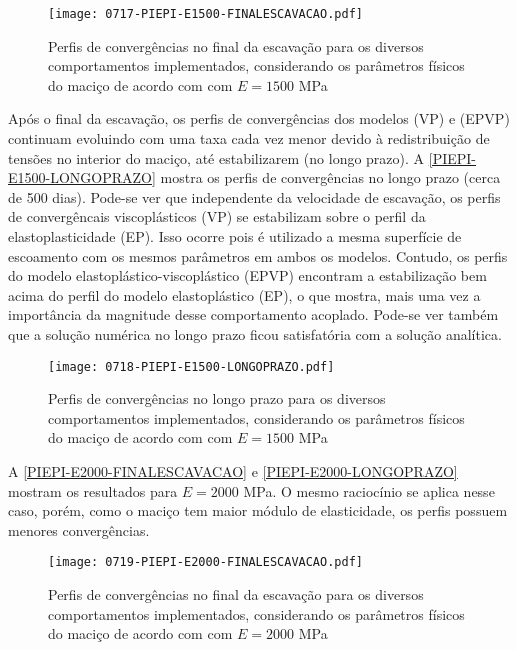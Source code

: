 \begin{figure}[H]
	\begin{center}
		\texttt{[image: 0717-PIEPI-E1500-FINALESCAVACAO.pdf]}
	\end{center}
	\caption{\label{PIEPI-E1500-FINALESCAVACAO}Perfis de convergências no final da escavação para os diversos comportamentos implementados, considerando os parâmetros físicos do maciço de acordo com  com $E=1500$ MPa}
\end{figure}

Após o final da escavação, os perfis de convergências dos modelos (VP) e (EPVP) continuam evoluindo com uma taxa cada vez menor devido à redistribuição de tensões no interior do maciço, até estabilizarem (no longo prazo). A \autoref{PIEPI-E1500-LONGOPRAZO} mostra os perfis de convergências no longo prazo (cerca de 500 dias). Pode-se ver que independente da velocidade de escavação, os perfis de convergêncais viscoplásticos (VP) se estabilizam sobre o perfil da elastoplasticidade (EP). Isso ocorre pois é utilizado a mesma superfície de escoamento com os mesmos parâmetros em ambos os modelos. Contudo, os perfis do modelo elastoplástico-viscoplástico (EPVP) encontram a estabilização bem acima do perfil do modelo elastoplástico (EP), o que mostra, mais uma vez a importância da magnitude desse comportamento acoplado. Pode-se ver também que a solução numérica no longo prazo ficou satisfatória com a solução analítica.

\begin{figure}[H]
	\begin{center}
		\texttt{[image: 0718-PIEPI-E1500-LONGOPRAZO.pdf]}
	\end{center}
	\caption{\label{PIEPI-E1500-LONGOPRAZO}Perfis de convergências no longo prazo para os diversos comportamentos implementados, considerando os parâmetros físicos do maciço de acordo com  com $E=1500$ MPa}
\end{figure}

A \autoref{PIEPI-E2000-FINALESCAVACAO} e \autoref{PIEPI-E2000-LONGOPRAZO} mostram os resultados para $E=2000$ MPa. O mesmo raciocínio se aplica nesse caso, porém, como o maciço tem maior módulo de elasticidade, os perfis possuem menores convergências.

\begin{figure}[H]
	\begin{center}
		\texttt{[image: 0719-PIEPI-E2000-FINALESCAVACAO.pdf]}
	\end{center}
	\caption{\label{PIEPI-E2000-FINALESCAVACAO}Perfis de convergências no final da escavação para os diversos comportamentos implementados, considerando os parâmetros físicos do maciço de acordo com  com $E=2000$ MPa}
\end{figure}

